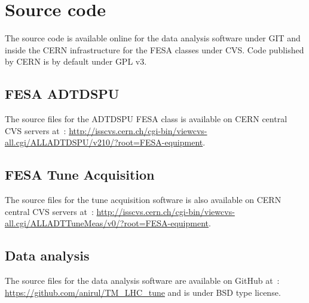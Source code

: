 \section{Source code}

The source code is available online for the data analysis software under GIT and inside the \gls{CERN} infrastructure for the \gls{FESA} classes under CVS. Code published by \gls{CERN} is by default under \gls{GPL} v3.

\subsection{FESA ADTDSPU}

The source files for the \gls{ADTDSPU} \gls{FESA} class is available on \gls{CERN} central \gls{CVS} servers at~: \url{http://isscvs.cern.ch/cgi-bin/viewcvs-all.cgi/ALLADTDSPU/v210/?root=FESA-equipment}.

\subsection{FESA Tune Acquisition}

The source files for the tune acquisition software is also available on \gls{CERN} central \gls{CVS} servers at~: \url{http://isscvs.cern.ch/cgi-bin/viewcvs-all.cgi/ALLADTTuneMeas/v0/?root=FESA-equipment}.

\subsection{Data analysis}

The source files for the data analysis software are available on GitHub at~: \url{https://github.com/anirul/TM_LHC_tune} and is under BSD type license.
